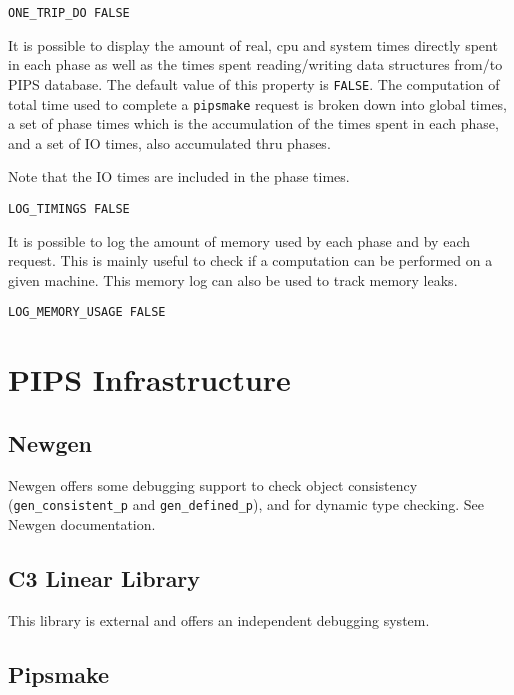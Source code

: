 \begin{verbatim}
ONE_TRIP_DO FALSE
\end{verbatim}

It is possible to display the amount of real, cpu and system times
directly spent in each phase as well as the times spent reading/writing data
structures from/to PIPS database. The default value of this property is
\verb+FALSE+. The computation of total time used to complete a
\verb+pipsmake+ request is broken down into global times, a set of phase times
which is the accumulation of the times spent in each phase, and a set of
IO times, also accumulated thru phases. 

Note that the IO times are included in the phase times.

\begin{verbatim}
LOG_TIMINGS FALSE
\end{verbatim}

It is possible to log the amount of memory used by each phase and by
each request. This is mainly useful to check if a computation can be
performed on a given machine. This memory log can also be used to track memory
leaks.

\begin{verbatim}
LOG_MEMORY_USAGE FALSE
\end{verbatim}

\section{PIPS Infrastructure}
\label{section-pips-infrastructure}

\subsection{Newgen}

Newgen offers some debugging support to check object consistency
(\verb+gen_consistent_p+ and \verb+gen_defined_p+), and for dynamic type
checking. See Newgen documentation\cite{JT89}\cite{JT90}.

\subsection{C3 Linear Library}

This library is external and offers an independent debugging system.

\subsection{Pipsmake}

